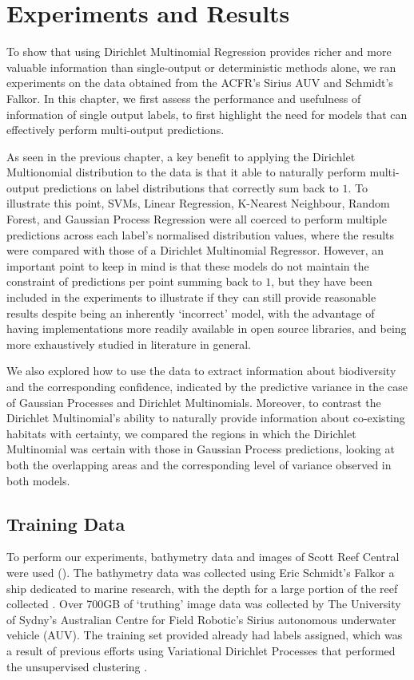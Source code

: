 \chapter{Experiments and Results} \label{chap:experiments}

To show that using Dirichlet Multinomial Regression provides richer and more valuable information than single-output or deterministic methods alone, we ran experiments on the data obtained from the ACFR's Sirius AUV and Schmidt's Falkor. In this chapter, we first assess the performance and usefulness of information of single output labels, to first highlight the need for models that can effectively perform multi-output predictions.

As seen in the previous chapter, a key benefit to applying the Dirichlet Multionomial distribution to the data is that it able to naturally perform multi-output predictions on label distributions that correctly sum back to $1$. To illustrate this point, SVMs, Linear Regression, K-Nearest Neighbour, Random Forest, and Gaussian Process Regression were all coerced to perform multiple predictions across each label's normalised distribution values, where the results were compared with those of a Dirichlet Multinomial Regressor. However, an important point to keep in mind is that these models do not maintain the constraint of predictions per point summing back to $1$, but they have been included in the experiments to illustrate if they can still provide reasonable results despite being an inherently `incorrect' model, with the advantage of having implementations more readily available in open source libraries, and being more exhaustively studied in literature in general.

We also explored how to use the data to extract information about biodiversity and the corresponding confidence, indicated by the predictive variance in the case of Gaussian Processes and Dirichlet Multinomials. Moreover, to contrast the Dirichlet Multinomial's ability to naturally provide information about co-existing habitats with certainty, we compared the regions in which the Dirichlet Multinomial was certain with those in Gaussian Process predictions, looking at both the overlapping areas and the corresponding level of variance observed in both models.

\section{Training Data}
To perform our experiments, bathymetry data and images of Scott Reef Central were used (). The bathymetry data was collected using Eric Schmidt's Falkor a ship dedicated to marine research, with the depth for a large portion of the reef collected . Over 700GB of `truthing' image data was collected by The University of Sydny's Australian Centre for Field Robotic's Sirius autonomous underwater vehicle (AUV). The training set provided already had labels assigned, which was a result of previous efforts using Variational Dirichlet Processes that performed the unsupervised clustering \citep{steinberg11}. 

